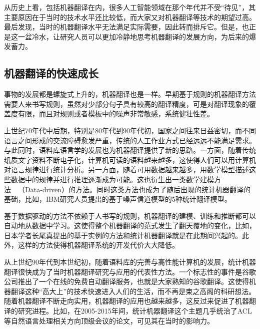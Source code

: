 \parinterval 从历史上看，包括机器翻译在内，很多人工智能领域在那个年代并不受“待见”，其主要原因在于当时的技术水平还比较低，而大家又对机器翻译等技术的期望过高。最后发现，当时的机器翻译水平无法满足实际需要，因此转而排斥它。但是，也正是这一盆冷水，让研究人员可以更加冷静地思考机器翻译的发展方向，为后来的爆发蓄力。


\subsection{机器翻译的快速成长}

\parinterval 事物的发展都是螺旋式上升的，机器翻译也是一样。早期基于规则的机器翻译方法需要人来书写规则，虽然对少部分句子具有较高的翻译精度，可是对翻译现象的覆盖度有限，而且对规则或者模板中的噪声非常敏感，系统健壮性差。

\parinterval 上世纪70年代中后期，特别是80年代到90年代初，国家之间往来日益密切，而不同语言之间形成的交流障碍愈发严重，传统的人工作业方式已经远远不能满足需求。与此同时，语料库语言学的发展也为机器翻译提供了新的思路。一方面，随着传统纸质文字资料不断电子化，计算机可读的语料越来越多，这使得人们可以用计算机对语言规律进行统计分析。另一方面，随着可用数据越来越多，用数学模型描述这些数据中的规律并进行推理逐渐成为可能。这也衍生出一类数学建模方法\ \dash\ {\small{}}（Data-driven）的方法。同时这类方法也成为了随后出现的统计机器翻译的基础，比如，IBM研究人员提出的基于噪声信道模型的5种统计翻译模型。

\parinterval 基于数据驱动的方法不依赖于人书写的规则，机器翻译的建模、训练和推断都可以自动地从数据中学习。这使得整个机器翻译的范式发生了翻天覆地的变化，比如，日本学者长尾真提出的基于实例的方法和统计机器翻译就是在此期间兴起的。此外，这样的方法使得机器翻译系统的开发代价大大降低。

\parinterval 从上世纪90年代到本世纪初，随着语料库的完善与高性能计算机的发展，统计机器翻译很快成为了当时机器翻译研究与应用的代表性方法。一个标志性的事件是谷歌公司推出了一个在线的免费自动翻译服务，也就是大家熟知的谷歌翻译。这使得机器翻译这种“高大上”的技术快速进入人们的生活，而不再是束之高阁的科研想法。随着机器翻译不断走向实用，机器翻译的应用也越来越多，这反过来促进了机器翻译的研究进程。比如，在2005-2015年间，统计机器翻译这个主题几乎统治了ACL等自然语言处理相关方向顶级会议的论文，可见其在当时的影响力。

